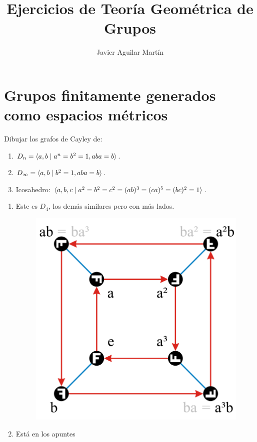\documentclass[twoside]{article}
\begin{document}
\title{Ejercicios de Teoría Geométrica de Grupos}
\author{Javier Aguilar Martín}
\maketitle

\section{Grupos finitamente generados como espacios métricos}

\begin{ejercicio}{1.1}
Dibujar los grafos de Cayley de:
\begin{enumerate}
\item $D_n=\langle{a,b\mid a^n=b^2=1,aba=b}\rangle$.
\item $D_\infty=\langle{a,b\mid b^2=1,aba=b}\rangle$.
\item Icosahedro: $\langle{a,b,c\mid a^2=b^2=c^2=(ab)^3=(ca)^5=(bc)^2=1}\rangle$.
\end{enumerate}

\end{ejercicio}
\begin{solucion}
\begin{enumerate}
\item Este es $D_4$, los demás similares pero con más lados. 
\begin{figure}[h!]
\includegraphics[scale=0.5]{Dih4}
\end{figure}
\item Está en los apuntes
\end{enumerate}
\end{solucion}
\end{document}
